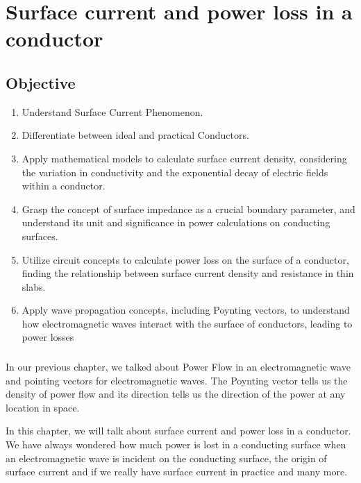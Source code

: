 \chapter{Surface current and power loss in a conductor}\label{lec:lec28}
\begin{mdframed}[backgroundcolor=lightblue, linewidth=1pt,  hidealllines=true]
\section{Objective}
\begin{enumerate}
	\item Understand Surface Current Phenomenon.
	\item Differentiate between ideal and practical Conductors.
	\item Apply mathematical models to calculate surface current density,
	considering the variation in conductivity and the exponential decay of
	electric fields within a conductor.
	\item Grasp the concept of surface impedance as a crucial boundary parameter, and
	understand its unit and significance in power calculations on conducting
	surfaces.
	\item Utilize circuit concepts to calculate power loss on the surface of a conductor,
	finding the relationship between surface current density and resistance in thin
	slabs.
	\item Apply wave propagation concepts, including Poynting vectors, to understand how electromagnetic waves interact with the surface of conductors, leading to power
	losses
\end{enumerate}
\end{mdframed}
\subsection{}
In our previous chapter, we talked about Power Flow in an electromagnetic wave and pointing vectors for electromagnetic waves. The Poynting vector tells us the density of power flow and its direction tells us the direction of the power at any location in space.

In this chapter, we will talk about surface current and power loss in a conductor. We have always wondered how much power is lost in a conducting surface when an electromagnetic wave is incident on the conducting surface, the origin of surface current and if we really have surface current in practice and many more.

